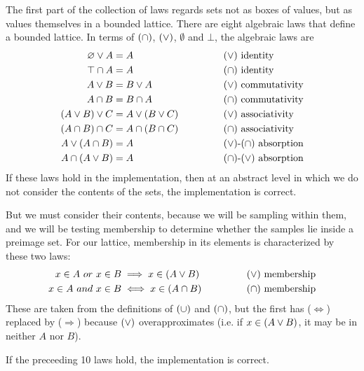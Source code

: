 The first part of the collection of laws regards sets not as boxes of values, but as values themselves in a bounded lattice.
There are eight algebraic laws that define a bounded lattice.
In terms of $(\cap)$, $(\vee)$, $\emptyset$ and $\bot$, the algebraic laws are
\begin{equation}
\begin{aligned}
	\varnothing \vee A &= A
	&&\text{$(\vee)$ identity} \\
	\top \cap A &= A
	&&\text{$(\cap)$ identity} \\
	A \vee B &= B \vee A
	&&\text{$(\vee)$ commutativity}\\
	A \cap B &= B \cap A
	&&\text{$(\cap)$ commutativity}\\
	(A \vee B) \vee C &= A \vee (B \vee C)
	\hspace{0.5in} &&\text{$(\vee)$ associativity}\\
	(A \cap B) \cap C &= A \cap (B \cap C)
	&&\text{$(\cap)$ associativity}\\
	A \vee (A \cap B) &= A
	&&\text{$(\vee)$-$(\cap)$ absorption}\\
	A \cap (A \vee B) &= A
	&&\text{$(\cap)$-$(\vee)$ absorption}
\end{aligned}
\end{equation}
If these laws hold in the implementation, then at an abstract level in which we do not consider the contents of the sets, the implementation is correct.

But we must consider their contents, because we will be sampling within them, and we will be testing membership to determine whether the samples lie inside a preimage set.
For our lattice, membership in its elements is characterized by these two laws:
\begin{equation}
\begin{aligned}
	x \in A~or~x \in B &\implies x \in (A \vee B)
	&&\text{$(\vee)$ membership} \\
	x \in A~and~x \in B &\iff x \in (A \cap B)
	\hspace{0.5in} &&\text{$(\cap)$ membership} \\
\end{aligned}
\end{equation}
These are taken from the definitions of $(\cup)$ and $(\cap)$, but the first has (${\Longleftrightarrow}$) replaced by (${\Longrightarrow}$) because $(\vee)$ overapproximates (i.e. if $x \in (A \vee B)$, it may be in neither $A$ nor $B$).

If the preceeding 10 laws hold, the implementation is correct.

